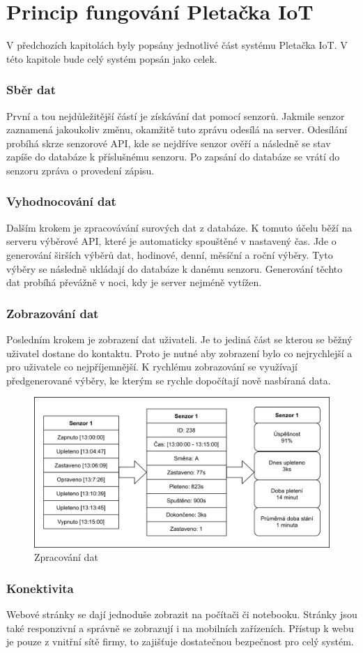 \chapter{Princip fungování Pletačka IoT}
V předchozích kapitolách byly popsány jednotlivé část systému Pletačka IoT.
V této kapitole bude celý systém popsán jako celek.


\subsection{Sběr dat}
První a tou nejdůležitější částí je získávání dat pomocí senzorů.
Jakmile senzor zaznamená jakoukoliv změnu, okamžitě tuto zprávu odesílá na server.
Odesílání probíhá skrze senzorové API, kde se nejdříve senzor ověří a následně se stav zapíše do databáze k příslušnému senzoru.
Po zapsání do databáze se vrátí do senzoru zpráva o provedení zápisu. 


\subsection{Vyhodnocování dat}
Dalším krokem je zpracovávání surových dat z databáze.
K tomuto účelu běží na serveru výběrové API, které je automaticky spouštěné v nastavený čas.
Jde o generování širších výběrů dat, hodinové, denní, měsíční a roční výběry.
Tyto výběry se následně ukládají do databáze k danému senzoru.
Generování těchto dat probíhá převážně v noci, kdy je server nejméně vytížen.


\subsection{Zobrazování dat}
Posledním krokem je zobrazení dat uživateli.
Je to jediná část se kterou se běžný uživatel dostane do kontaktu.
Proto je nutné aby zobrazení bylo co nejrychlejší a pro uživatele co nejpříjemnější.
K rychlému zobrazování se využívají předgenerované výběry, ke kterým se rychle dopočítají nově nasbíraná data.

\fxnote[author=JA]{\textcolor{mygreen}{schéma sběr - vyhodnocení - zobrazení}}

\begin{figure}[htbp]
    \centering
    \includegraphics[width=\textwidth]{img/Princip.png}
    \caption{Zpracování dat}
    \label{fig:princip}
\end{figure}

\subsection{Konektivita}
Webové stránky se dají jednoduše zobrazit na počítači či notebooku.
Stránky jsou také responzivní a správně se zobrazují i na mobilních zařízeních.
Přístup k webu je pouze z vnitřní sítě firmy, to zajišťuje dostatečnou bezpečnost pro celý systém.


\newpage
